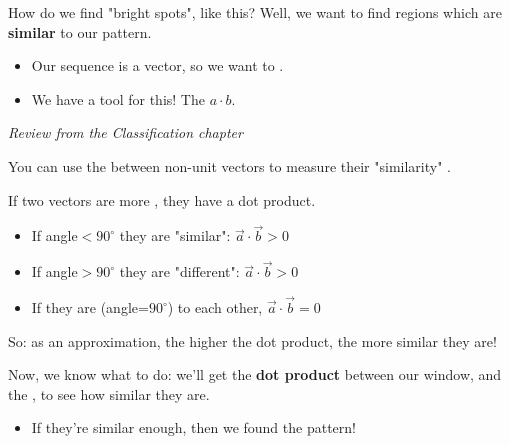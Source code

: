         How do we find "bright spots", like this? Well, we want to find regions which are \textbf{similar} to our pattern.

        \begin{itemize}
            \item Our sequence is a vector, so we want to .
            \item We have a tool for this! The  $a \cdot b$.\\
        \end{itemize}

        \begin{concept}
            \textit{Review from the Classification chapter}
            
            You can use the  between non-unit vectors to measure their "similarity" . 
            
            If two vectors are more , they have a  dot product. 
            
            \begin{itemize}
                \item If angle$<90^{\circ}$ they are "similar": $\vec{a} \cdot \vec{b} > 0$
                
                \item If angle$>90^{\circ}$ they are "different": $\vec{a} \cdot \vec{b} > 0$
                
                \item If they are  (angle=$90^{\circ}$) to each other, $\vec{a} \cdot \vec{b} = 0$
            \end{itemize}
        \end{concept}

        So: as an approximation, the higher the dot product, the more similar they are!

        Now, we know what to do: we'll get the \textbf{dot product} between our window, and the , to see how similar they are.

        \begin{itemize}
            \item If they're similar enough, then we found the pattern!\\
        \end{itemize}

